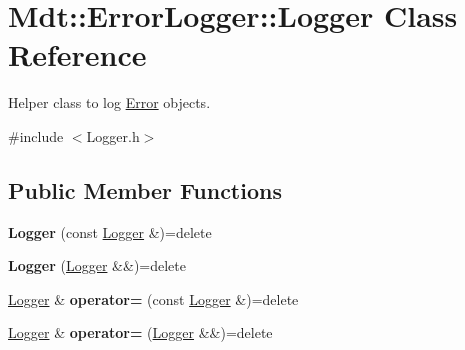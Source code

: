 \hypertarget{class_mdt_1_1_error_logger_1_1_logger}{}\section{Mdt\+:\+:Error\+Logger\+:\+:Logger Class Reference}
\label{class_mdt_1_1_error_logger_1_1_logger}


Helper class to log \hyperlink{class_mdt_1_1_error}{Error} objects.  




{\ttfamily \#include $<$Logger.\+h$>$}

\subsection*{Public Member Functions}
\begin{DoxyCompactItemize}
\item 
{\bfseries Logger} (const \hyperlink{class_mdt_1_1_error_logger_1_1_logger}{Logger} \&)=delete\hypertarget{class_mdt_1_1_error_logger_1_1_logger_a7bafe61d7b9487f34043aadeb5877199}{}\label{class_mdt_1_1_error_logger_1_1_logger_a7bafe61d7b9487f34043aadeb5877199}

\item 
{\bfseries Logger} (\hyperlink{class_mdt_1_1_error_logger_1_1_logger}{Logger} \&\&)=delete\hypertarget{class_mdt_1_1_error_logger_1_1_logger_a43285dd16581acb2b1a6b9ed19d67d88}{}\label{class_mdt_1_1_error_logger_1_1_logger_a43285dd16581acb2b1a6b9ed19d67d88}

\item 
\hyperlink{class_mdt_1_1_error_logger_1_1_logger}{Logger} \& {\bfseries operator=} (const \hyperlink{class_mdt_1_1_error_logger_1_1_logger}{Logger} \&)=delete\hypertarget{class_mdt_1_1_error_logger_1_1_logger_a6544b92bff85410562d099d1875d6d36}{}\label{class_mdt_1_1_error_logger_1_1_logger_a6544b92bff85410562d099d1875d6d36}

\item 
\hyperlink{class_mdt_1_1_error_logger_1_1_logger}{Logger} \& {\bfseries operator=} (\hyperlink{class_mdt_1_1_error_logger_1_1_logger}{Logger} \&\&)=delete\hypertarget{class_mdt_1_1_error_logger_1_1_logger_a870e8601a17811c0b9e8d60603dc9cbe}{}\label{class_mdt_1_1_error_logger_1_1_logger_a870e8601a17811c0b9e8d60603dc9cbe}

\end{DoxyCompactItemize}
